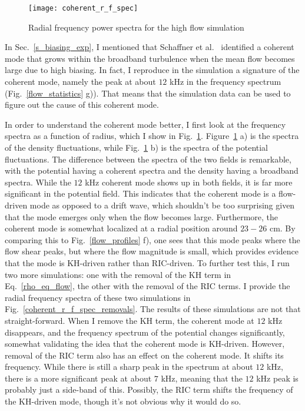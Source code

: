 \begin{figure}
\centerline{\texttt{[image: coherent\_r\_f\_spec]}}
\caption{Radial frequency power spectra for the high flow simulation}
\label{coherent_r_f_spec}
\end{figure}

In Sec.~\ref{s_biasing_exp}, I mentioned that Schaffner et al.~\cite{schaffner2012} identified a coherent mode that grows within the broadband turbulence when the mean 
flow becomes large due to high biasing. In fact, I reproduce in the simulation a signature of the coherent mode, namely the peak at about $12$ kHz in the frequency spectrum (Fig.~\ref{flow_statistics} g)).
That means that the simulation data can be used to figure out the cause of this coherent mode.

In order to understand the coherent mode better, I first look at the frequency spectra as a function of radius, which I show in Fig.~\ref{coherent_r_f_spec}. Figure~\ref{coherent_r_f_spec} a)
is the spectra of the density fluctuations, while Fig.~\ref{coherent_r_f_spec} b) is the spectra of the potential fluctuations. The difference between the spectra of the two fields is remarkable,
with the potential having a coherent spectra and the density having a broadband spectra. While the $12$ kHz coherent mode shows up in both fields, it is far more significant in the potential field.
This indicates that the coherent mode is a flow-driven mode as opposed to a drift wave, which shouldn't be too surprising given that the mode emerges only when the flow becomes large.
Furthermore, the coherent mode is somewhat localized at a radial position around $23-26$ cm. By comparing this to Fig.~\ref{flow_profiles} f), one sees that this mode peaks where the flow shear
peaks, but where the flow magnitude is small, which provides evidence that the mode is KH-driven rather than RIC-driven. To further test this, I run two more simulations: one with the removal
of the KH term in Eq.~\ref{rho_eq_flow}, the other with the removal of the RIC terms. I provide the radial frequency spectra of these two simulations in Fig.~\ref{coherent_r_f_spec_removals}.
The results of these simulations are not that straight-forward. When I remove the KH term, the coherent mode at $12$ kHz disappears, and the frequency spectrum of the potential changes significantly,
somewhat validating the idea that the coherent mode is KH-driven. However, removal of the RIC term also has an effect on the coherent mode. It shifts its frequency. While there is still a sharp peak
in the spectrum at about $12$ kHz, there is a more significant peak at about $7$ kHz, meaning that the $12$ kHz peak is probably just a side-band of this. Possibly, the RIC term shifts the
frequency of the KH-driven mode, though it's not obvious why it would do so.

